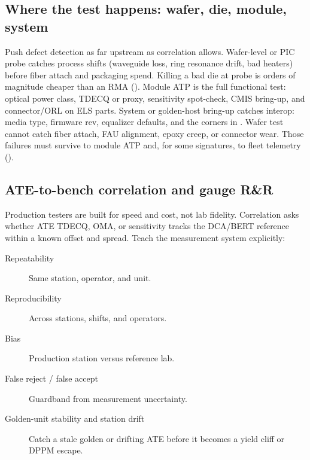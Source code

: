 
\subsection{Where the test happens: wafer, die, module, system}

Push defect detection as far upstream as correlation allows. Wafer-level or PIC
probe catches process shifts (waveguide loss, ring resonance drift, bad heaters)
before fiber attach and packaging spend. Killing a bad die at probe is orders of
magnitude cheaper than an RMA (). Module ATP is the
full functional test: optical power class, TDECQ or proxy, sensitivity spot-check,
CMIS bring-up, and connector/ORL on ELS parts. System or golden-host bring-up
catches interop: media type, firmware rev, equalizer defaults, and the corners in
. Wafer test cannot catch fiber attach, FAU alignment,
epoxy creep, or connector wear. Those failures must survive to module ATP and,
for some signatures, to fleet telemetry ().

\subsection{ATE-to-bench correlation and gauge R\&R}
\label{sec:gauge-rr}

Production testers are built for speed and cost, not lab fidelity. Correlation
asks whether ATE TDECQ, OMA, or sensitivity tracks the DCA/BERT reference within
a known offset and spread. Teach the measurement system explicitly:

\begin{description}
\item[Repeatability] Same station, operator, and unit.
\item[Reproducibility] Across stations, shifts, and operators.
\item[Bias] Production station versus reference lab.
\item[False reject / false accept] Guardband from measurement uncertainty.
\item[Golden-unit stability and station drift] Catch a stale golden or drifting
      ATE before it becomes a yield cliff or DPPM escape.
\end{description}

